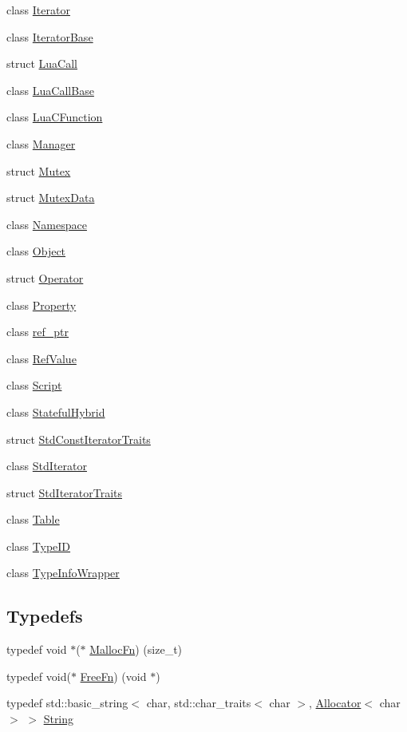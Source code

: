 \begin{DoxyCompactItemize}
class \hyperlink{classSLB_1_1Iterator}{Iterator}
\item 
class \hyperlink{classSLB_1_1IteratorBase}{Iterator\+Base}
\item 
struct \hyperlink{structSLB_1_1LuaCall}{Lua\+Call}
\item 
class \hyperlink{classSLB_1_1LuaCallBase}{Lua\+Call\+Base}
\item 
class \hyperlink{classSLB_1_1LuaCFunction}{Lua\+C\+Function}
\item 
class \hyperlink{classSLB_1_1Manager}{Manager}
\item 
struct \hyperlink{structSLB_1_1Mutex}{Mutex}
\item 
struct \hyperlink{structSLB_1_1MutexData}{Mutex\+Data}
\item 
class \hyperlink{classSLB_1_1Namespace}{Namespace}
\item 
class \hyperlink{classSLB_1_1Object}{Object}
\item 
struct \hyperlink{structSLB_1_1Operator}{Operator}
\item 
class \hyperlink{classSLB_1_1Property}{Property}
\item 
class \hyperlink{classSLB_1_1ref__ptr}{ref\+\_\+ptr}
\item 
class \hyperlink{classSLB_1_1RefValue}{Ref\+Value}
\item 
class \hyperlink{classSLB_1_1Script}{Script}
\item 
class \hyperlink{classSLB_1_1StatefulHybrid}{Stateful\+Hybrid}
\item 
struct \hyperlink{structSLB_1_1StdConstIteratorTraits}{Std\+Const\+Iterator\+Traits}
\item 
class \hyperlink{classSLB_1_1StdIterator}{Std\+Iterator}
\item 
struct \hyperlink{structSLB_1_1StdIteratorTraits}{Std\+Iterator\+Traits}
\item 
class \hyperlink{classSLB_1_1Table}{Table}
\item 
class \hyperlink{classSLB_1_1TypeID}{Type\+ID}
\item 
class \hyperlink{classSLB_1_1TypeInfoWrapper}{Type\+Info\+Wrapper}
\end{DoxyCompactItemize}
\subsection*{Typedefs}
\begin{DoxyCompactItemize}
\item 
typedef void $\ast$($\ast$ \hyperlink{namespaceSLB_ad4a59728754dc01e43be2604d8e094b8}{Malloc\+Fn}) (size\+\_\+t)
\item 
typedef void($\ast$ \hyperlink{namespaceSLB_aee2b8902225c24449d7070dcfe702a30}{Free\+Fn}) (void $\ast$)
\item 
typedef std\+::basic\+\_\+string$<$ char, std\+::char\+\_\+traits$<$ char $>$, \hyperlink{classSLB_1_1Allocator}{Allocator}$<$ char $>$ $>$ \hyperlink{namespaceSLB_a6a4c36e7004d99c0535c2c91c200c9a1}{String}
\end{DoxyCompactItemize}
